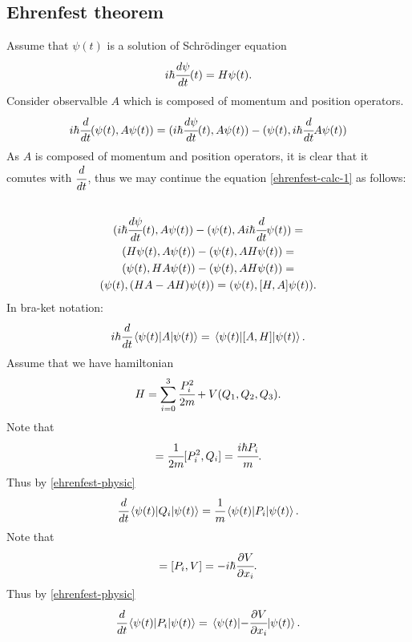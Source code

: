 \documentclass[main.tex]{subfiles}
\begin{document}
\subsection{Ehrenfest theorem}
Assume that $\psi(t)$ is a solution of Schrödinger equation
\begin{equation}
i\hbar \cfrac{d \psi}{d t}(t) = H\psi(t).
\end{equation}
Consider observalble $A$ which is composed of momentum and position operators.
\begin{equation}
\label{ehrenfest-calc-1}
i\hbar \cfrac{d}{d t}(\psi(t), A\psi(t)) = (i\hbar \cfrac{d \psi}{d t}(t), A\psi(t)) - (\psi(t), i\hbar \cfrac{d}{d t} A\psi(t))
\end{equation}
As $A$ is composed of momentum and position operators, it is clear that it comutes with $\cfrac{d}{d t}$, thus we may continue the equation \ref{ehrenfest-calc-1} as follows:
\begin{multline}
\\(i\hbar \cfrac{d \psi}{d t}(t), A\psi(t)) - (\psi(t), Ai\hbar \cfrac{d}{d t}\psi(t)) = 
\\ (H\psi(t), A\psi(t)) - (\psi(t), AH\psi(t)) =
\\(\psi(t), HA\psi(t)) - (\psi(t), AH\psi(t)) = 
\\(\psi(t), (HA - AH)\psi(t)) = (\psi(t), [H,A]\psi(t)).
\\
\end{multline}
In bra-ket notation:
\begin{equation}
\label{ehrenfest-physic}
i\hbar \cfrac{d}{d t} \mel{\psi(t)}{A}{\psi(t)} = \mel{\psi(t)}{[A,H]}{\psi(t)}.
\end{equation}
Assume that we have hamiltonian 
\begin{equation}
H = \sum_{i=0}^3 \cfrac{P_i^2}{2m} + V(Q_1,Q_2,Q_3).
\end{equation}
Note that
\begin{equation}
[Q_i, H] = \cfrac{1}{2m}[P_i^2, Q_i] = \cfrac{i\hbar P_i}{m}.
\end{equation}
Thus by \ref{ehrenfest-physic}
\begin{equation}
\cfrac{d}{d t} \mel{\psi(t)}{Q_i}{\psi(t)} = \cfrac{1}{m}\mel{\psi(t)}{P_i}{\psi(t)}.
\end{equation}
Note that
\begin{equation}
[P_i, H] = [P_i, V] = -i\hbar \cfrac{\partial V}{\partial x_i}. 
\end{equation}
Thus by \ref{ehrenfest-physic}
\begin{equation}
\cfrac{d}{d t} \mel{\psi(t)}{P_i}{\psi(t)} = \mel{\psi(t)}{-\cfrac{\partial V}{\partial x_i}}{\psi(t)}.
\end{equation}
\end{document}
